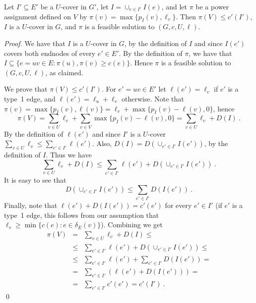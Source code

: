 \documentclass{llncs}
\begin{document}
\begin{lemma} \label{l:D}
Let $I' \subseteq E'$ be a $U$-cover in $G'$, 
let $I=\cup_{e \in I'} I(e)$, and let $\pi$ 
be a power assignment defined on $V$ by $\pi(v)=\max\{p_I(v),\ell_v\}$.
Then $\pi(V) \leq c'(I')$, $I$ is a $U$-cover in $G$,
and $\pi$ is a feasible solution to $(G,c,U,\ell)$.
\end{lemma}
\begin{proof}
We have that $I$ is a $U$-cover in $G$, by the definition of $I$
and since $I(e')$ covers both endnodes of every $e' \in E'$.  
By the definition of $\pi$, we have that $I \subseteq \{e=uv\in E: \pi(u),\pi(v)\geq c(e)\}$. 
Hence $\pi$ is a feasible solution to $(G,c,U,\ell)$, as claimed.

We prove that $\pi(V) \leq c'(I')$.
For $e'=uv \in E'$ let $\ell(e')=\ell_v$ if $e'$ is a type~1 edge,
and $\ell(e')=\ell_u+\ell_v$ otherwise.
Note that 
$\pi(v)=\max\{p_I(v),\ell(v)\}=\ell_v+\max\{p_I(v)-\ell(v),0\}$, hence
$$\pi(V) = \sum_{v \in U} \ell_v + \sum_{v \in V}\max\{p_I(v)-\ell(v),0\}=
\sum_{v \in U} \ell_v + D(I) \ .$$ 
By the definition of $\ell(e')$ and since $I'$ is a $U$-cover
$\sum_{v \in U} \ell_v \leq \sum_{e' \in I'}\ell(e')$.
Also, $D(I) = D\left(\cup_{e' \in I'}I(e')\right)$, by the definition of $I$.
Thus we have
$$\sum_{v \in U} \ell_v +D(I) \leq 
\sum_{e' \in I'}\ell(e') + D\left(\cup_{e' \in I'}I(e')\right) \ .$$
It is easy to see that 
$$D\left(\cup_{e' \in I'}I(e')\right) \leq \sum_{e' \in I'}D(I(e')) \ .$$
Finally, note that $\ell(e')+D(I(e'))=c'(e')$ for every $e' \in I'$ 
(if $e'$ is a type~1 edge, this follows from our assumption that 
$\ell_v \geq \min\{c(e):e \in \delta_E(v)\}$).
Combining we get
\begin{eqnarray*} 
\pi(V) & =    & \sum_{v \in U} \ell_v +D(I) \leq \\ 
       & \leq & \sum_{e' \in I'}\ell(e') + D\left(\cup_{e' \in I'}I(e')\right) \leq \\
       & \leq & \sum_{e' \in I'}\ell(e')+\sum_{e' \in I'}D(I(e'))= \\
       & =    & \sum_{e' \in I'} \left(\ell(e')+D(I(e'))\right) = \\
       & =    & \sum_{e' \in I'} c'(e') = c'(I') \ .
\end{eqnarray*}
\qed
\end{proof}
\end{document}

